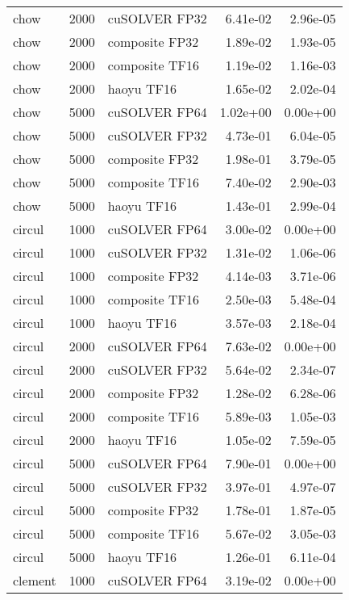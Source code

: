 \begin{table}
\begin{tabular}{lrlrr}
     chow &  2000 &  cuSOLVER FP32 &  6.41e-02 &        2.96e-05 \\
     chow &  2000 & composite FP32 &  1.89e-02 &        1.93e-05 \\
     chow &  2000 & composite TF16 &  1.19e-02 &        1.16e-03 \\
     chow &  2000 &     haoyu TF16 &  1.65e-02 &        2.02e-04 \\
     chow &  5000 &  cuSOLVER FP64 &  1.02e+00 &        0.00e+00 \\
     chow &  5000 &  cuSOLVER FP32 &  4.73e-01 &        6.04e-05 \\
     chow &  5000 & composite FP32 &  1.98e-01 &        3.79e-05 \\
     chow &  5000 & composite TF16 &  7.40e-02 &        2.90e-03 \\
     chow &  5000 &     haoyu TF16 &  1.43e-01 &        2.99e-04 \\
   circul &  1000 &  cuSOLVER FP64 &  3.00e-02 &        0.00e+00 \\
   circul &  1000 &  cuSOLVER FP32 &  1.31e-02 &        1.06e-06 \\
   circul &  1000 & composite FP32 &  4.14e-03 &        3.71e-06 \\
   circul &  1000 & composite TF16 &  2.50e-03 &        5.48e-04 \\
   circul &  1000 &     haoyu TF16 &  3.57e-03 &        2.18e-04 \\
   circul &  2000 &  cuSOLVER FP64 &  7.63e-02 &        0.00e+00 \\
   circul &  2000 &  cuSOLVER FP32 &  5.64e-02 &        2.34e-07 \\
   circul &  2000 & composite FP32 &  1.28e-02 &        6.28e-06 \\
   circul &  2000 & composite TF16 &  5.89e-03 &        1.05e-03 \\
   circul &  2000 &     haoyu TF16 &  1.05e-02 &        7.59e-05 \\
   circul &  5000 &  cuSOLVER FP64 &  7.90e-01 &        0.00e+00 \\
   circul &  5000 &  cuSOLVER FP32 &  3.97e-01 &        4.97e-07 \\
   circul &  5000 & composite FP32 &  1.78e-01 &        1.87e-05 \\
   circul &  5000 & composite TF16 &  5.67e-02 &        3.05e-03 \\
   circul &  5000 &     haoyu TF16 &  1.26e-01 &        6.11e-04 \\
  clement &  1000 &  cuSOLVER FP64 &  3.19e-02 &        0.00e+00 \\

\end{tabular}
\end{table}
